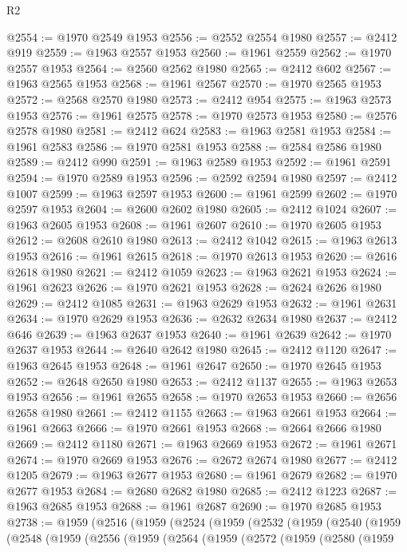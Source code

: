 \begin{lexlean}{R2}
\begin{coremodule}
@2554 := @1970 @2549 @1953
@2556 := @2552 @2554 @1980
@2557 := @2412 @919
@2559 := @1963 @2557 @1953
@2560 := @1961 @2559
@2562 := @1970 @2557 @1953
@2564 := @2560 @2562 @1980
@2565 := @2412 @602
@2567 := @1963 @2565 @1953
@2568 := @1961 @2567
@2570 := @1970 @2565 @1953
@2572 := @2568 @2570 @1980
@2573 := @2412 @954
@2575 := @1963 @2573 @1953
@2576 := @1961 @2575
@2578 := @1970 @2573 @1953
@2580 := @2576 @2578 @1980
@2581 := @2412 @624
@2583 := @1963 @2581 @1953
@2584 := @1961 @2583
@2586 := @1970 @2581 @1953
@2588 := @2584 @2586 @1980
@2589 := @2412 @990
@2591 := @1963 @2589 @1953
@2592 := @1961 @2591
@2594 := @1970 @2589 @1953
@2596 := @2592 @2594 @1980
@2597 := @2412 @1007
@2599 := @1963 @2597 @1953
@2600 := @1961 @2599
@2602 := @1970 @2597 @1953
@2604 := @2600 @2602 @1980
@2605 := @2412 @1024
@2607 := @1963 @2605 @1953
@2608 := @1961 @2607
@2610 := @1970 @2605 @1953
@2612 := @2608 @2610 @1980
@2613 := @2412 @1042
@2615 := @1963 @2613 @1953
@2616 := @1961 @2615
@2618 := @1970 @2613 @1953
@2620 := @2616 @2618 @1980
@2621 := @2412 @1059
@2623 := @1963 @2621 @1953
@2624 := @1961 @2623
@2626 := @1970 @2621 @1953
@2628 := @2624 @2626 @1980
@2629 := @2412 @1085
@2631 := @1963 @2629 @1953
@2632 := @1961 @2631
@2634 := @1970 @2629 @1953
@2636 := @2632 @2634 @1980
@2637 := @2412 @646
@2639 := @1963 @2637 @1953
@2640 := @1961 @2639
@2642 := @1970 @2637 @1953
@2644 := @2640 @2642 @1980
@2645 := @2412 @1120
@2647 := @1963 @2645 @1953
@2648 := @1961 @2647
@2650 := @1970 @2645 @1953
@2652 := @2648 @2650 @1980
@2653 := @2412 @1137
@2655 := @1963 @2653 @1953
@2656 := @1961 @2655
@2658 := @1970 @2653 @1953
@2660 := @2656 @2658 @1980
@2661 := @2412 @1155
@2663 := @1963 @2661 @1953
@2664 := @1961 @2663
@2666 := @1970 @2661 @1953
@2668 := @2664 @2666 @1980
@2669 := @2412 @1180
@2671 := @1963 @2669 @1953
@2672 := @1961 @2671
@2674 := @1970 @2669 @1953
@2676 := @2672 @2674 @1980
@2677 := @2412 @1205
@2679 := @1963 @2677 @1953
@2680 := @1961 @2679
@2682 := @1970 @2677 @1953
@2684 := @2680 @2682 @1980
@2685 := @2412 @1223
@2687 := @1963 @2685 @1953
@2688 := @1961 @2687
@2690 := @1970 @2685 @1953
@2738 := @1959
    (@2516
      (@1959
        (@2524
          (@1959
            (@2532
              (@1959
                (@2540
                  (@1959
                    (@2548
                      (@1959
                        (@2556
                          (@1959
                            (@2564
                              (@1959
                                (@2572
                                  (@1959
                                    (@2580
                                      (@1959

\end{coremodule}
\end{lexlean}
